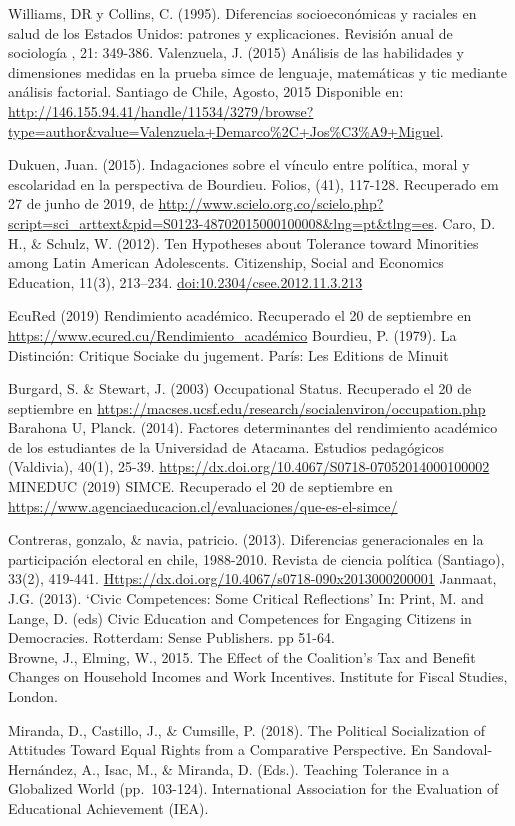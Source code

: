 \documentclass[
]{article}
\begin{document}
Williams, DR y Collins, C. (1995). Diferencias socioeconómicas y
raciales en salud de los Estados Unidos: patrones y explicaciones.
Revisión anual de sociología , 21: 349-386. Valenzuela, J. (2015)
Análisis de las habilidades y dimensiones medidas en la prueba simce de
lenguaje, matemáticas y tic mediante análisis factorial. Santiago de
Chile, Agosto, 2015 Disponible en:
\url{http://146.155.94.41/handle/11534/3279/browse?type=author\&value=Valenzuela+Demarco\%2C+Jos\%C3\%A9+Miguel}.

Dukuen, Juan. (2015). Indagaciones sobre el vínculo entre política,
moral y escolaridad en la perspectiva de Bourdieu. Folios, (41),
117-128. Recuperado em 27 de junho de 2019, de
\url{http://www.scielo.org.co/scielo.php?script=sci_arttext\&pid=S0123-48702015000100008\&lng=pt\&tlng=es}.
Caro, D. H., \& Schulz, W. (2012). Ten Hypotheses about Tolerance toward
Minorities among Latin American Adolescents. Citizenship, Social and
Economics Education, 11(3), 213--234.
\url{doi:10.2304/csee.2012.11.3.213}

EcuRed (2019) Rendimiento académico. Recuperado el 20 de septiembre en
\url{https://www.ecured.cu/Rendimiento_académico} Bourdieu, P. (1979).
La Distinción: Critique Sociake du jugement. París: Les Editions de
Minuit

Burgard, S. \& Stewart, J. (2003) Occupational Status. Recuperado el 20
de septiembre en
\url{https://macses.ucsf.edu/research/socialenviron/occupation.php}
Barahona U, Planck. (2014). Factores determinantes del rendimiento
académico de los estudiantes de la Universidad de Atacama. Estudios
pedagógicos (Valdivia), 40(1), 25-39.
\url{https://dx.doi.org/10.4067/S0718-07052014000100002} MINEDUC (2019)
SIMCE. Recuperado el 20 de septiembre en
\url{https://www.agenciaeducacion.cl/evaluaciones/que-es-el-simce/}

Contreras, gonzalo, \& navia, patricio. (2013). Diferencias
generacionales en la participación electoral en chile, 1988-2010.
Revista de ciencia política (Santiago), 33(2), 419-441.
\url{Https://dx.doi.org/10.4067/s0718-090x2013000200001} Janmaat, J.G.
(2013). `Civic Competences: Some Critical Reflections' In: Print, M. and
Lange, D. (eds) Civic Education and Competences for Engaging Citizens in
Democracies. Rotterdam: Sense Publishers. pp 51-64.\\
Browne, J., Elming, W., 2015. The Effect of the Coalition's Tax and
Benefit Changes on Household Incomes and Work Incentives. Institute for
Fiscal Studies, London.

Miranda, D., Castillo, J., \& Cumsille, P. (2018). The Political
Socialization of Attitudes Toward Equal Rights from a Comparative
Perspective. En Sandoval-Hernández, A., Isac, M., \& Miranda, D. (Eds.).
Teaching Tolerance in a Globalized World (pp.~103-124). International
Association for the Evaluation of Educational Achievement (IEA).
\end{document}
